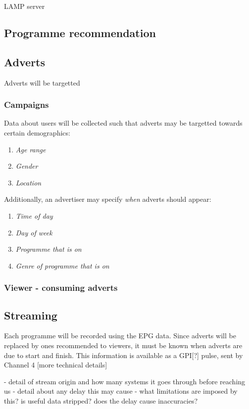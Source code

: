 \documentclass[12pt,a4paper,twoside, titlepage, openright, cleardoublepage=empty]{article}
\begin{document}
LAMP server

\subsection{Programme recommendation}

\subsection{Adverts}

Adverts will be targetted

\subsubsection{Campaigns}

Data about users will be collected such that adverts may be targetted towards certain demographics:
\begin{enumerate}
\item \textit{Age range}
\item \textit{Gender}
\item \textit{Location}
\end{enumerate}

Additionally, an advertiser may specify \textit{when} adverts should appear:
\begin{enumerate}
\item \textit{Time of day}
\item \textit{Day of week}
\item \textit{Programme that is on}
\item \textit{Genre of programme that is on}
\end{enumerate}

\subsubsection{Viewer - consuming adverts}

\subsection{Streaming}
Each programme will be recorded using the EPG data. Since adverts will be replaced by ones recommended to viewers, it must be known when adverts are due to start and finish. This information is available as a GPI[?] pulse, sent by Channel 4 [more technical details]

- detail of stream origin and how many systems it goes through before reaching us
- detail about any delay this may cause
- what limitations are imposed by this? is useful data stripped? does the delay cause inaccuracies?
\end{document}
